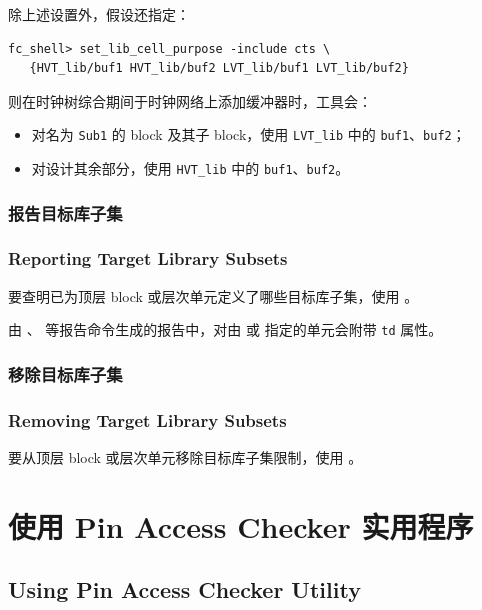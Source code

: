 除上述设置外，假设还指定：
\begin{lstlisting}
fc_shell> set_lib_cell_purpose -include cts \
   {HVT_lib/buf1 HVT_lib/buf2 LVT_lib/buf1 LVT_lib/buf2}
\end{lstlisting}

则在时钟树综合期间于时钟网络上添加缓冲器时，工具会：
\begin{itemize}
  \item 对名为 \texttt{Sub1} 的 block 及其子 block，使用 \texttt{LVT\_lib} 中的 \texttt{buf1}、\texttt{buf2}；
  \item 对设计其余部分，使用 \texttt{HVT\_lib} 中的 \texttt{buf1}、\texttt{buf2}。
\end{itemize}

\subsubsection{报告目标库子集}
\subsubsection*{Reporting Target Library Subsets}

要查明已为顶层 block 或层次单元定义了哪些目标库子集，使用 。

由 、 等报告命令生成的报告中，对由  或  指定的单元会附带 \texttt{td} 属性。

\subsubsection{移除目标库子集}
\subsubsection*{Removing Target Library Subsets}

要从顶层 block 或层次单元移除目标库子集限制，使用 。



\section{使用 Pin Access Checker 实用程序}
\subsection*{Using Pin Access Checker Utility}

